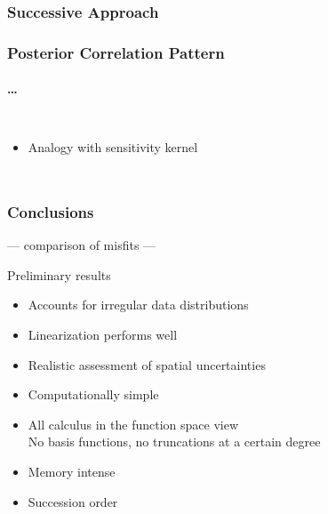 \documentclass[aspectratio=169, t, 10pt]{beamer}
\begin{document}
\begin{frame}
    \frametitle{Successive Approach}
    \begin{center}
    \end{center}
\end{frame}


\begin{frame}
    \frametitle{Posterior Correlation Pattern}
    \framesubtitle{\dots }

\begin{columns}
%
    \begin{itemize}
        \item Analogy with sensitivity kernel
    \end{itemize}

    \vspace{-10mm}

\end{columns}

\end{frame}


\begin{frame}
    \frametitle{Conclusions}

    --- comparison of misfits ---

    Preliminary results
    \begin{itemize}
        \item Accounts for irregular data distributions
        \item Linearization performs well
        \item Realistic assessment of spatial uncertainties
        \item Computationally simple
        \item All calculus in the function space view \\
              No basis functions, no truncations at a certain degree
        \item Memory intense
        \item Succession order
    \end{itemize}


\end{frame}
\end{document}
